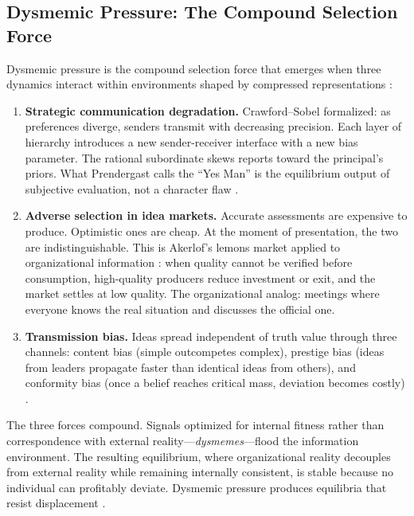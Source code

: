 \documentclass[11pt,a4paper]{article}
\begin{document}
\subsection{Dysmemic Pressure: The Compound Selection Force}

Dysmemic pressure is the compound selection force that emerges when three dynamics interact within environments shaped by compressed representations \citep{mcentire2025a}:

\begin{enumerate}
\item \textbf{Strategic communication degradation.} Crawford--Sobel formalized: as preferences diverge, senders transmit with decreasing precision. Each layer of hierarchy introduces a new sender-receiver interface with a new bias parameter. The rational subordinate skews reports toward the principal's priors. What Prendergast calls the ``Yes Man'' is the equilibrium output of subjective evaluation, not a character flaw \citep{prendergast1993}.

\item \textbf{Adverse selection in idea markets.} Accurate assessments are expensive to produce. Optimistic ones are cheap. At the moment of presentation, the two are indistinguishable. This is Akerlof's lemons market applied to organizational information \citep{akerlof1970}: when quality cannot be verified before consumption, high-quality producers reduce investment or exit, and the market settles at low quality. The organizational analog: meetings where everyone knows the real situation and discusses the official one.

\item \textbf{Transmission bias.} Ideas spread independent of truth value through three channels: content bias (simple outcompetes complex), prestige bias (ideas from leaders propagate faster than identical ideas from others), and conformity bias (once a belief reaches critical mass, deviation becomes costly) \citep{boyd1985}.
\end{enumerate}

The three forces compound. Signals optimized for internal fitness rather than correspondence with external reality---\emph{dysmemes}---flood the information environment. The resulting equilibrium, where organizational reality decouples from external reality while remaining internally consistent, is stable because no individual can profitably deviate. Dysmemic pressure produces equilibria that resist displacement \citep{mcentire2025a}.
\end{document}

